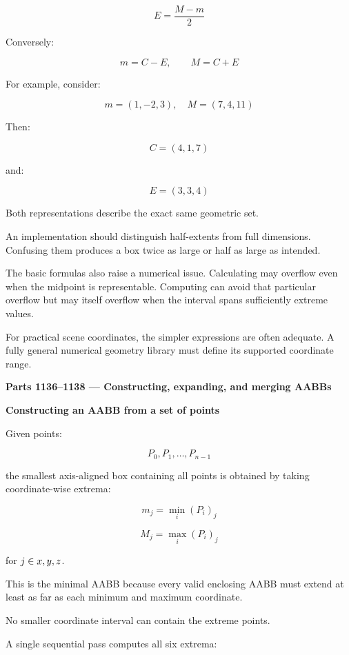 \[
\boxed{E=\frac{M-m}{2}}
\]

Conversely:

\[
\boxed{m=C-E,\qquad M=C+E}
\]

For example, consider:

\[
m=(1,-2,3),\quad M=(7,4,11)
\]

Then:

\[
C=(4,1,7)
\]

and:

\[
E=(3,3,4)
\]

Both representations describe the exact same geometric set.

An implementation should distinguish half-extents from full dimensions. Confusing them produces a box twice as large or half as large as intended.

The basic formulas also raise a numerical issue. Calculating  may overflow even when the midpoint is representable. Computing  can avoid that particular overflow but may itself overflow when the interval spans sufficiently extreme values.

For practical scene coordinates, the simpler expressions are often adequate. A fully general numerical geometry library must define its supported coordinate range.

\textbf{Parts 1136--1138 --- Constructing, expanding, and merging AABBs}

\textbf{Constructing an AABB from a set of points}

Given points:

\[
P_0,P_1,\ldots,P_{n-1}
\]

the smallest axis-aligned box containing all points is obtained by taking coordinate-wise extrema:

\[
\boxed{ m_j=\min_i(P_i)_j }
\]

\[
\boxed{ M_j=\max_i(P_i)_j }
\]

for \(j\in\\{x,y,z\\}\).

This is the minimal AABB because every valid enclosing AABB must extend at least as far as each minimum and maximum coordinate.

No smaller coordinate interval can contain the extreme points.

A single sequential pass computes all six extrema:

